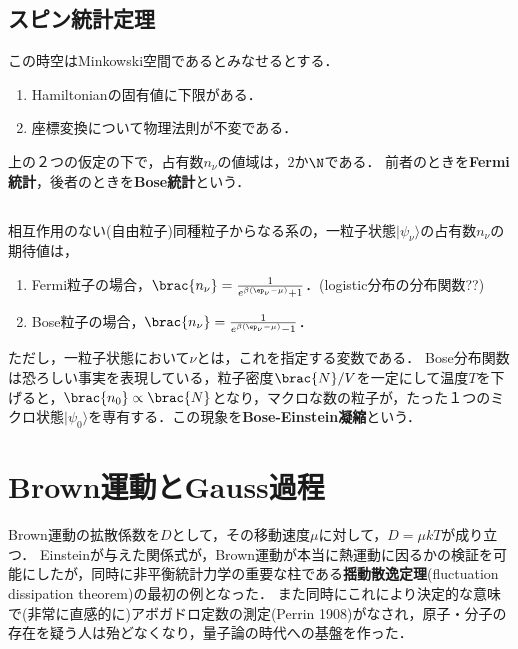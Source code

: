 \documentclass[uplatex,dvipdfmx]{jsreport}
\begin{document}
\subsection{スピン統計定理}

\begin{axiom}
    この時空はMinkowski空間であるとみなせるとする．
    \begin{enumerate}
        \item Hamiltonianの固有値に下限がある．
        \item 座標変換について物理法則が不変である．
    \end{enumerate}
\end{axiom}

\begin{theorem}[Pauliのスピン統計定理]
    上の２つの仮定の下で，占有数$n_\nu$の値域は，$2$か$\N$である．
    前者のときを\textbf{Fermi統計}，後者のときを\textbf{Bose統計}という．
\end{theorem}

\subsection{}

\begin{example}
    相互作用のない(自由粒子)同種粒子からなる系の，一粒子状態$|\psi_\nu\rangle$の占有数$n_\nu$の期待値は，
    \begin{enumerate}
        \item Fermi粒子の場合，$\brac{n_\nu}=\frac{1}{e^{\beta(\ep_\nu-\mu)}+1}$．(logistic分布の分布関数??)
        \item Bose粒子の場合，$\brac{n_\nu}=\frac{1}{e^{\beta(\ep_\nu-\mu)}-1}$．
    \end{enumerate}
    ただし，一粒子状態において$\nu$とは，これを指定する変数である．
    Bose分布関数は恐ろしい事実を表現している，粒子密度$\brac{N}/V$を一定にして温度$T$を下げると，$\brac{n_0}\propto\brac{N}$となり，マクロな数の粒子が，たった１つのミクロ状態$|\psi_0\rangle$を専有する．この現象を\textbf{Bose-Einstein凝縮}という．
\end{example}

\section{Brown運動とGauss過程}

\begin{tcolorbox}[colframe=ForestGreen, colback=ForestGreen!10!white,breakable,colbacktitle=ForestGreen!40!white,coltitle=black,fonttitle=\bfseries\sffamily,
title=]
    Brown運動の拡散係数を$D$として，その移動速度$\mu$に対して，$D=\mu kT$が成り立つ．
    Einsteinが与えた関係式が，Brown運動が本当に熱運動に因るかの検証を可能にしたが，同時に非平衡統計力学の重要な柱である\textbf{揺動散逸定理}(fluctuation dissipation theorem)の最初の例となった．
    また同時にこれにより決定的な意味で(非常に直感的に)アボガドロ定数の測定(Perrin 1908)がなされ，原子・分子の存在を疑う人は殆どなくなり，量子論の時代への基盤を作った．
\end{tcolorbox}
\end{document}
